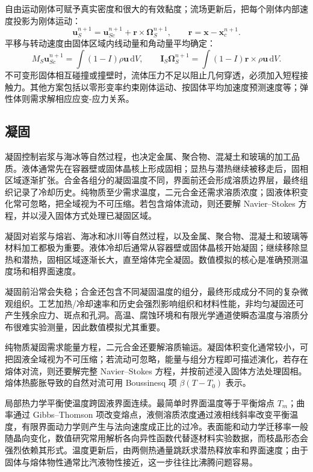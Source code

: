 \documentclass[11pt,a4paper,openany,fontset=none]{ctexbook}
\begin{document}
自由运动刚体可赋予真实密度和很大的有效黏度；流场更新后，把每个刚体内部速度投影为刚体运动：
\begin{equation}
 \bm u_S^{n+1}=\bm u_{Sc}^{n+1}+\bm r\times\bm\Omega_S^{n+1},
 \qquad \bm r=\bm x-\bm x_c^{n+1}. \tag{11.17}
\end{equation}
平移与转动速度由固体区域内线动量和角动量平均确定：
\begin{equation}
 M_S\bm u_{Sc}^{n+1}=\int(1-I)\rho\bm u\,\mathrm dV,
 \qquad \bm I_S\bm\Omega_S^{n+1}=\int(1-I)\bm r\times\rho\bm u\,\mathrm dV. \tag{11.18}
\end{equation}
不可变形固体相互碰撞或撞壁时，流体压力不足以阻止几何穿透，必须加入短程接触力。其他方案包括以零形变率约束刚体运动、按固体平均加速度预测速度等；弹性体则需求解相应应变-应力关系。

\subsection{凝固}
凝固控制岩浆与海冰等自然过程，也决定金属、聚合物、混凝土和玻璃的加工品质。液体通常先在容器壁或固体晶核上形成固相；显热与潜热继续被移走后，固相区域逐渐扩张。合金各组分的凝固温度不同，界面前还会形成溶质边界层，最终组织记录了冷却历史。纯物质至少需求温度，二元合金还需求溶质浓度；固液体积变化常可忽略，把全域视为不可压缩。若包含熔体流动，则还要解 Navier--Stokes 方程，并以浸入固体方式处理已凝固区域。


凝固对岩浆与熔岩、海冰和冰川等自然过程，以及金属、聚合物、混凝土和玻璃等材料加工都极为重要。液体冷却后通常从容器壁或固体晶核开始凝固；继续移除显热和潜热，固相区域逐渐长大，直至熔体完全凝固。数值模拟的核心是准确预测温度场和相界面速度。

凝固前沿常会失稳；合金还包含不同凝固温度的组分，最终形成成分不同的复杂微观组织。工艺加热/冷却速率和历史会强烈影响组织和材料性能，非均匀凝固还可产生残余应力、斑点和孔洞。高温、腐蚀环境和有限光学通道使瞬态温度与溶质分布很难实验测量，因此数值模拟尤其重要。

纯物质凝固需求能量方程，二元合金还要解溶质输运。凝固体积变化通常较小，可把固液全域视为不可压缩；若流动可忽略，能量与组分方程即可描述演化，若存在熔体对流，则还要解完整 Navier--Stokes 方程，并按前述浸入固体方法处理固相。熔体热膨胀导致的自然对流可用 Boussinesq 项 $\beta(T-T_0)$ 表示。

局部热力学平衡使温度跨固液界面连续。最简单时界面温度等于平衡熔点 $T_m$；曲率通过 Gibbs--Thomson 项改变熔点，液侧溶质浓度通过液相线斜率改变平衡温度，有限界面动力学则产生与法向速度成正比的过冷。表面能和动力学迁移率一般随晶向变化，数值研究常用解析各向异性函数代替逐材料实验数据，而枝晶形态会强烈依赖其形式。温度更新后，由两侧热通量跳跃求潜热释放率和界面速度；由于固体与熔体物性通常比汽液物性接近，这一步往往比沸腾问题容易。
\end{document}

